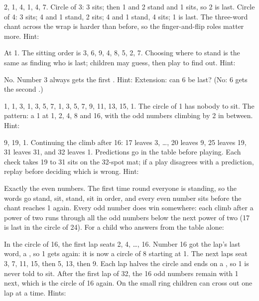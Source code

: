2, 1, 4, 1, 4, 7. Circle of 3: 3 sits; then 1 and 2 stand and 1 sits, so 2 is last. Circle of 4: 3 sits; 4 and 1 stand, 2 sits; 4 and 1 stand, 4 sits; 1 is last. The three-word chant across the wrap is harder than before, so the finger-and-flip roles matter more. Hint: 

At 1. The sitting order is 3, 6, 9, 4, 8, 5, 2, 7. Choosing where to stand is the same as finding who is last; children may guess, then play to find out. Hint: 

No. Number 3 always gets the first . Hint:  Extension: can 6 be last? (No: 6 gets the second .)

1, 1, 3, 1, 3, 5, 7, 1, 3, 5, 7, 9, 11, 13, 15, 1. The circle of 1 has nobody to sit. The pattern: a 1 at 1, 2, 4, 8 and 16, with the odd numbers climbing by 2 in between. Hint: 

9, 19, 1. Continuing the climb after 16: 17 leaves 3, \dots, 20 leaves 9, 25 leaves 19, 31 leaves 31, and 32 leaves 1. Predictions go in the table before playing. Each check takes 19 to 31 sits on the 32-spot mat; if a play disagrees with a prediction, replay before deciding which is wrong. Hint: 

Exactly the even numbers. The first time round everyone is standing, so the words go stand, sit, stand, sit in order, and every even number sits before the chant reaches 1 again. Every odd number does win somewhere: each climb after a power of two runs through all the odd numbers below the next power of two (17 is last in the circle of 24). For a child who answers from the table alone: 

In the circle of 16, the first lap seats 2, 4, \dots, 16. Number 16 got the lap's last word, a , so 1 gets  again: it is now a circle of 8 starting at 1. The next laps seat 3, 7, 11, 15, then 5, 13, then 9. Each lap halves the circle and ends on a , so 1 is never told to sit. After the first lap of 32, the 16 odd numbers remain with 1 next, which is the circle of 16 again. On the small ring children can cross out one lap at a time. Hints:  

